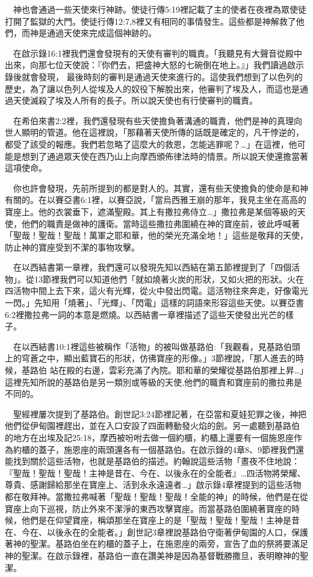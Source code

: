 \documentclass{book}
\begin{document}
　神也會通過一些天使來行神跡。使徒行傳5:19裡記載了主的使者在夜裡為眾使徒打開了監獄的大門。使徒行傳12:7,8裡又有相同的事情發生。這些都是神解救了他們，而神是通過天使來完成這個神跡的。

　在啟示錄16:1裡我們還會發現有的天使有審判的職責。「我聽見有大聲音從殿中出來，向那七位天使說：『你們去，把盛神大怒的七碗倒在地上。』」我們讀過啟示錄後就會發現， 最後時刻的審判是通過天使來進行的。這使我們想到了以色列的歷史，為了讓以色列人從埃及人的奴役下解脫出來，他審判了埃及人，而這也是通過天使滅殺了埃及人所有的長子。所以說天使也有行使審判的職責。

　在希伯來書2:2裡，我們還發現有些天使擔負著溝通的職責，他們是神的真理向世人顯明的管道。他在這裡說，「那藉著天使所傳的話既是確定的，凡干悖逆的，都受了該受的報應。我們若忽略了這麼大的救恩，怎能逃罪呢？…」在這裡，他可能是想到了通過眾天使在西乃山上向摩西頒佈律法時的情景。所以說天使還擔當著這項使命。

　你也許會發現，先前所提到的都是對人的。其實，還有些天使擔負的使命是和神有關的。在以賽亞書6:1裡，以賽亞說，「當烏西雅王崩的那年，我見主坐在高高的寶座上。他的衣裳垂下，遮滿聖殿。其上有撒拉弗侍立…」撒拉弗是某個等級的天使，他們的職責是做神的護衛。當時這些撒拉弗圍繞在神的寶座前，彼此呼喊著「聖哉！聖哉！聖哉！萬軍之耶和華，他的榮光充滿全地！」這些是敬拜的天使，防止神的寶座受到不潔的事物攻擊。

　在以西結書第一章裡，我們還可以發現先知以西結在第五節裡提到了「四個活物」。從13節裡我們可以知道他們「就如燒著火炭的形狀，又如火把的形狀。火在四活物中間上去下來，這火有光輝，從火中發出閃電。這活物往來奔走，好像電光一閃。」先知用「燒著」、「光輝」、「閃電」這樣的詞語來形容這些天使。以賽亞書6:2裡撒拉弗一詞的本意是燃燒。以西結書一章裡描述了這些天使發出光芒的樣子。

　在以西結書10:1裡這些被稱作「活物」的被叫做基路伯:「我觀看，見基路伯頭上的穹蒼之中，顯出藍寶石的形狀，仿彿寶座的形像。」3節裡說，「那人進去的時候，基路伯 站在殿的右邊，雲彩充滿了內院。耶和華的榮耀從基路伯那裡上昇…」這裡先知所說的基路伯是另一類別或等級的天使,他們的職責和寶座前的撒拉弗是不同的。

　聖經裡屢次提到了基路伯。創世記3:24節裡記著，在亞當和夏娃犯罪之後，神把他們從伊甸園裡趕出，並在入口安設了四面轉動發火焰的劍。另一處聽到基路伯 的地方在出埃及記25:18，摩西被吩咐去做一個約櫃，約櫃上還要有一個施恩座作為約櫃的蓋子，施恩座的兩頭還各有一個基路伯。在啟示錄的4章8、9節裡我們還能找到關於這些活物，也就是基路伯的描述。約翰說這些活物「晝夜不住地說：『聖哉！聖哉！聖哉！主神是昔在、今在、以後永在的全能者』…四活物將榮耀、尊貴、感謝歸給那坐在寶座上、活到永永遠遠者…」啟示錄4章裡提到的這些活物都在敬拜神。當撒拉弗喊著「聖哉！聖哉！聖哉！全能的神」的時候，他們是在從寶座上向下巡視，防止外來不潔淨的東西攻擊寶座。而當基路伯圍繞著寶座的時候，他們是在仰望寶座，稱頌那坐在寶座上的是「聖哉！聖哉！聖哉！主神是昔在、今在、以後永在的全能者。」創世記3章裡說基路伯守衛著伊甸園的人口，保護著神的聖潔。基路伯坐在約櫃的蓋子上，在施恩座的兩旁，宣告了血的祭將要滿足神的聖潔。在啟示錄裡，基路伯一直在讚美神是因為基督戰勝撒旦，表明瞭神的聖潔。
\end{document}
